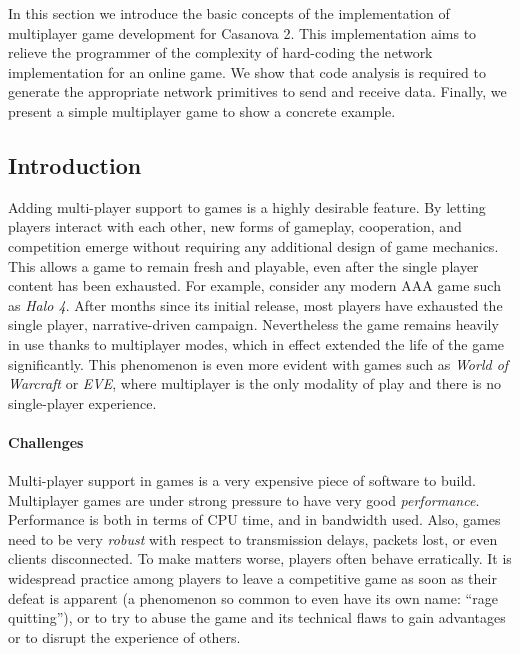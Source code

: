 In this section we introduce the basic concepts of the implementation of multiplayer game development for Casanova 2. This implementation aims to relieve the programmer of the complexity of hard-coding the network implementation for an online game. We show that code analysis is required to generate the appropriate network primitives to send and receive data. Finally, we present a simple multiplayer game to show a concrete example.

\subsection*{Introduction}
Adding multi-player support to games is a highly desirable feature. By letting players interact with each other, new forms of gameplay, cooperation, and competition emerge without requiring any additional design of game mechanics. This allows a game to remain fresh and playable, even after the single player content has been exhausted. For example, consider any modern AAA game such as \textit{Halo 4}. After months since its initial release, most players have exhausted the single player, narrative-driven campaign. Nevertheless the game remains heavily in use thanks to multiplayer modes, which in effect extended the life of the game significantly. This phenomenon is even more evident with games such as \textit{World of Warcraft} or \textit{EVE}, where multiplayer is the only modality of play and there is no single-player experience.

\paragraph*{Challenges}
Multi-player support in games is a very expensive piece of software to build. Multiplayer games are under strong pressure to have very good \textit{performance}. Performance is both in terms of CPU time, and in bandwidth used. Also, games need to be very \textit{robust} with respect to transmission delays, packets lost, or even clients disconnected. To make matters worse, players often behave erratically. It is widespread practice among players to leave a competitive game as soon as their defeat is apparent (a phenomenon so common to even have its own name: ``rage quitting''), or to try to abuse the game and its technical flaws to gain advantages or to disrupt the experience of others.

